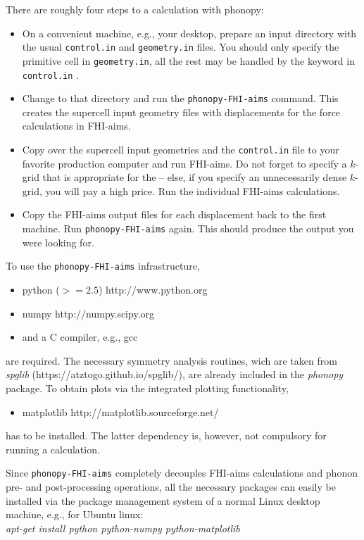 There are roughly four steps to a calculation with phonopy:
\begin{itemize}
  \item On a convenient machine, e.g., your desktop, prepare an input
    directory with the usual \texttt{control.in} and
    \texttt{geometry.in} files. You should only specify the primitive
    cell in \texttt{geometry.in}, all the rest may be handled by the
     keyword in \texttt{control.in} .
  \item Change to that directory and run the \texttt{phonopy-FHI-aims}
    command. This creates the supercell input geometry files with
    displacements for the force calculations in FHI-aims.
  \item Copy over the supercell input geometries and the
    \texttt{control.in} file to your favorite production computer and
    run FHI-aims. Do not forget to specify a $k$-grid that is
    appropriate for the  -- else, if you specify an
    unnecessarily dense $k$-grid, you will pay a high price. Run the
    individual FHI-aims calculations.
  \item Copy the FHI-aims output files for each displacement back to
    the first machine. Run \texttt{phonopy-FHI-aims} again. This
    should produce the output you were looking for.
\end{itemize}

To use the \texttt{phonopy-FHI-aims} infrastructure,
\begin{itemize}
\item[] python ($>=2.5$) http://www.python.org
\item[] numpy http://numpy.scipy.org
\item[] and a C compiler, e.g., gcc 
\end{itemize}
are required. The necessary symmetry analysis routines, wich are
taken from {\it spglib} (https://atztogo.github.io/spglib/), are already
included in the {\it phonopy} package. To obtain plots via the integrated 
plotting functionality,
\begin{itemize}
\item[] matplotlib http://matplotlib.sourceforge.net/
\end{itemize}
has to be installed. The latter dependency is, however, not compulsory
for running a calculation. 

Since \texttt{phonopy-FHI-aims} completely decouples FHI-aims
calculations and phonon pre- and post-processing operations, all the
necessary packages can easily be installed via the package management
system of a normal Linux desktop machine, e.g., for Ubuntu linux:\\  
{\it apt-get install python python-numpy python-matplotlib}

